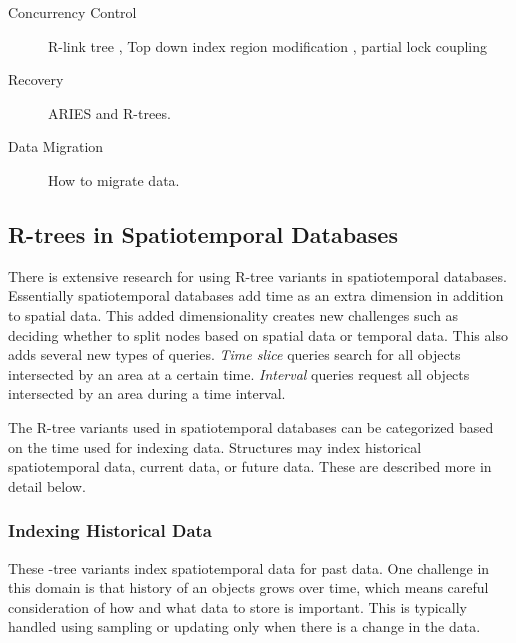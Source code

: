 \begin{description}
	\item[Concurrency Control] R-link tree \cite{kornacker1995high}, 
	Top down index region modification \cite{ravi1998improved},
	partial lock coupling \cite{song2004enhanced}
	\item[Recovery] ARIES and R-trees.
	\item[Data Migration] How to migrate data.
\end{description}

\subsection{R-trees in Spatiotemporal Databases}
There is extensive research for using R-tree variants in spatiotemporal
databases. Essentially spatiotemporal databases add time as an extra dimension
in addition to spatial data. This added dimensionality creates new challenges
such as deciding whether to split nodes based on spatial data or temporal data. 
This also adds several new types of queries. \emph{Time slice}
queries search for all objects intersected by an area at a certain time. 
\emph{Interval} queries request all objects intersected by an area during a time
interval.

The R-tree variants used in spatiotemporal databases can be categorized based
on the time used for indexing data. Structures may index historical 
spatiotemporal data, current data, or future data. These are described more
in detail below.

\subsubsection{Indexing Historical Data}
These \rbase-tree variants index spatiotemporal data for past data. One challenge
in this domain is that history of an objects grows over time, which means 
careful consideration of how and what data to store is important. This is 
typically handled using sampling or updating only when there is a change in the
data. 

